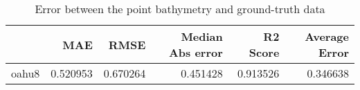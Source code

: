 \begin{table}[h!]
\caption{Error between the point bathymetry and ground-truth data}
\label{tab:oahu8_lidar_error}
\begin{tabular}{lrrrrr}
\toprule
 & MAE & RMSE & Median Abs error & R2 Score & Average Error \\
\midrule
oahu8 & 0.520953 & 0.670264 & 0.451428 & 0.913526 & 0.346638 \\
\bottomrule
\end{tabular}
\end{table}
